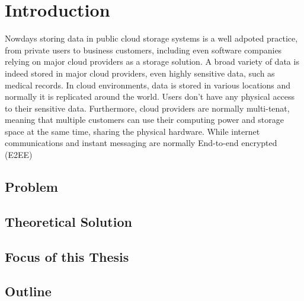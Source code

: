 \chapter{Introduction}

Nowdays storing data in public cloud storage systems is a well adpoted practice,
from private users to business customers, 
including even software companies relying on major cloud providers as a storage solution.
A broad variety of data is indeed stored in major cloud providers, even highly sensitive data,
such as medical records.
In cloud environments, data is stored in various locations and normally it is replicated
around the world. Users don't have any physical access to their sensitive data.
Furthermore, cloud providers are normally multi-tenat, meaning that multiple customers
can use their computing power and storage space at the same time, sharing the physical hardware.
While internet communications and instant messaging are normally End-to-end encrypted (E2EE)




\section{Problem}

\section{Theoretical Solution}

\section{Focus of this Thesis}

\section{Outline}